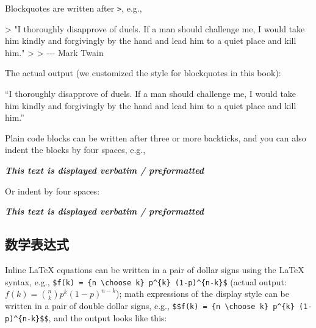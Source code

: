 \documentclass[
  12pt,
]{krantz}
\newenvironment{Shaded}{\begin{snugshade}}{\end{snugshade}}
\newcommand{\AttributeTok}[1]{\textcolor[rgb]{0.77,0.63,0.00}{#1}}
\newcommand{\InformationTok}[1]{\textcolor[rgb]{0.56,0.35,0.01}{\textbf{\textit{#1}}}}
\newcommand{\NormalTok}[1]{#1}
\renewenvironment{quote}{\begin{VF}}{\end{VF}}
\theoremstyle{definition}
\theoremstyle{definition}
\theoremstyle{definition}
\theoremstyle{definition}
\theoremstyle{remark}
\begin{document}
Blockquotes are written after \texttt{\textgreater{}}, e.g.,

\begin{Shaded}
\begin{Highlighting}[]
\AttributeTok{\textgreater{} "I thoroughly disapprove of duels. If a man should challenge me,}
\AttributeTok{  I would take him kindly and forgivingly by the hand and lead him}
\AttributeTok{  to a quiet place and kill him."}
\AttributeTok{\textgreater{}}
\AttributeTok{\textgreater{} {-}{-}{-} Mark Twain}
\end{Highlighting}
\end{Shaded}

The actual output (we customized the style for blockquotes in this book):

\begin{quote}
``I thoroughly disapprove of duels. If a man should challenge me,
I would take him kindly and forgivingly by the hand and lead him
to a quiet place and kill him.''

\end{quote}

Plain code blocks can be written after three or more backticks, and you can also indent the blocks by four spaces, e.g.,

\begin{Shaded}
\begin{Highlighting}[]
\InformationTok{\textasciigrave{}\textasciigrave{}\textasciigrave{}}
\InformationTok{This text is displayed verbatim / preformatted}
\InformationTok{\textasciigrave{}\textasciigrave{}\textasciigrave{}}

\NormalTok{Or indent by four spaces:}

\InformationTok{    This text is displayed verbatim / preformatted}
\end{Highlighting}
\end{Shaded}

\hypertarget{ux6570ux5b66ux8868ux8fbeux5f0f}{%
\subsection{数学表达式}\label{ux6570ux5b66ux8868ux8fbeux5f0f}}

Inline LaTeX equations can be written in a pair of dollar signs using the LaTeX syntax, e.g., \texttt{\$f(k)\ =\ \{n\ \textbackslash{}choose\ k\}\ p\^{}\{k\}\ (1-p)\^{}\{n-k\}\$} (actual output: \(f(k)={n \choose k}p^{k}(1-p)^{n-k}\)); math expressions of the display style can be written in a pair of double dollar signs, e.g., \texttt{\$\$f(k)\ =\ \{n\ \textbackslash{}choose\ k\}\ p\^{}\{k\}\ (1-p)\^{}\{n-k\}\$\$}, and the output looks like this:
\end{document}
